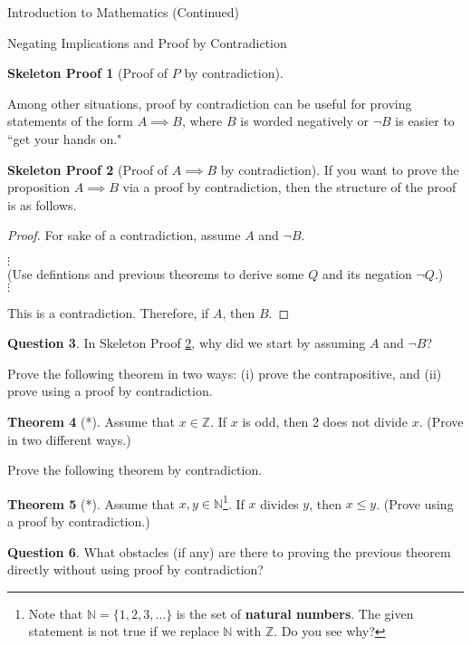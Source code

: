 \documentclass[11pt]{article}
\theoremstyle{definition}
\newtheorem{theorem}{Theorem}[section]
\newtheorem{question}[theorem]{Question}
\newtheorem{skeleton}[theorem]{Skeleton Proof}
\newenvironment{textbox}{\noindent\begin{lrbox}{\savepar}\begin{minipage}[c]{.98\textwidth}}{\end{minipage}\end{lrbox}\fcolorbox{black}{white}{\usebox{\savepar}}}
\begin{document}
\begin{section}{Introduction to Mathematics (Continued)}
\begin{subsection}{Negating Implications and Proof by Contradiction}
\begin{skeleton}[Proof of $P$ by contradiction]
\end{skeleton}

Among other situations, proof by contradiction can be useful for proving statements of the form $A\implies B$, where $B$ is worded negatively or $\neg B$ is easier to ``get your hands on."  

\begin{skeleton}[Proof of $A\implies B$ by contradiction]\label{pf by contradiction for implication}
If you want to prove the proposition $A\implies B$ via a proof by contradiction, then the structure of the proof is as follows.

\bigskip

\begin{textbox}
\begin{proof}
For sake of a contradiction, assume $A$ and $\neg B$.
\begin{center}
$\vdots$\\
(Use defintions and previous theorems to derive some $Q$ and its negation $\neg Q$.)\\
$\vdots$
\end{center}
\noindent This is a contradiction.  Therefore, if $A$, then $B$.
\end{proof}
\end{textbox}
\end{skeleton}

\begin{question}
In Skeleton Proof \ref{pf by contradiction for implication}, why did we start by assuming $A$ and $\neg B$?
\end{question}

Prove the following theorem in two ways: (i) prove the contrapositive, and (ii) prove using a proof by contradiction.

\begin{theorem}[*]
Assume that $x\in\mathbb{Z}$.  If $x$ is odd, then 2 does not divide $x$. (Prove in two different ways.)
\end{theorem}

Prove the following theorem by contradiction.

\begin{theorem}[*]
Assume that $x,y\in\mathbb{N}$\footnote{Note that $\mathbb{N}=\{1,2,3,\ldots\}$ is the set of \textbf{natural numbers}. The given statement is not true if we replace $\mathbb{N}$ with $\mathbb{Z}$.  Do you see why?}.  If $x$ divides $y$, then $x\leq y$. (Prove using a proof by contradiction.)
\end{theorem}

\begin{question}
What obstacles (if any) are there to proving the previous theorem directly without using proof by contradiction?
\end{question}

\end{subsection}

\end{section}
\end{document}
